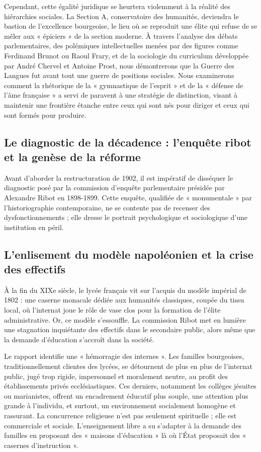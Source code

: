 Cependant, cette égalité juridique se heurtera violemment à la réalité des hiérarchies sociales. La
Section A, conservatoire des humanités, deviendra le bastion de l'excellence bourgeoise, le lieu où
se reproduit une élite qui refuse de se mêler aux « épiciers » de la section moderne. À travers
l'analyse des débats parlementaires, des polémiques intellectuelles menées par des figures comme
Ferdinand Brunot ou Raoul Frary, et de la sociologie du curriculum développée par André Chervel et
Antoine Prost, nous démontrerons que la Guerre des Langues fut avant tout une guerre de positions
sociales. Nous examinerons comment la rhétorique de la « gymnastique de l'esprit » et de la «
défense de l'âme française » a servi de paravent à une stratégie de distinction, visant à maintenir
une frontière étanche entre ceux qui sont nés pour diriger et ceux qui sont formés pour produire.



\subsection{Le diagnostic de la décadence : l'enquête ribot et la genèse de la réforme}

Avant d'aborder la restructuration de 1902, il est impératif de disséquer le diagnostic posé par la
commission d'enquête parlementaire présidée par Alexandre Ribot en 1898-1899. Cette enquête,
qualifiée de « monumentale » par l'historiographie contemporaine, ne se contente pas de recenser des
dysfonctionnements ; elle dresse le portrait psychologique et sociologique d'une institution en
péril.\cite{I-2-1-ref1}



\subsection{L'enlisement du modèle napoléonien et la crise des effectifs}

À la fin du XIXe siècle, le lycée français vit sur l'acquis du modèle impérial de 1802 : une caserne
monacale dédiée aux humanités classiques, coupée du tissu local, où l'internat joue le rôle de vase
clos pour la formation de l'élite administrative.\cite{I-2-1-ref1} Or, ce modèle s'essouffle. La
commission Ribot met en lumière une stagnation inquiétante des effectifs dans le secondaire public,
alors même que la demande d'éducation s'accroît dans la société.

Le rapport identifie une « hémorragie des internes ».\cite{I-2-1-ref1} Les familles bourgeoises,
traditionnellement clientes des lycées, se détournent de plus en plus de l'internat public, jugé
trop rigide, impersonnel et moralement neutre, au profit des établissements privés ecclésiastiques.
Ces derniers, notamment les collèges jésuites ou marianistes, offrent un encadrement éducatif plus
souple, une attention plus grande à l'individu, et surtout, un environnement socialement homogène et
rassurant.\cite{I-2-1-ref1} La concurrence religieuse n'est pas seulement spirituelle ; elle est
commerciale et sociale. L'enseignement libre a su s'adapter à la demande des familles en proposant
des « maisons d'éducation » là où l'État proposait des « casernes d'instruction ».\cite{I-2-1-ref1}


